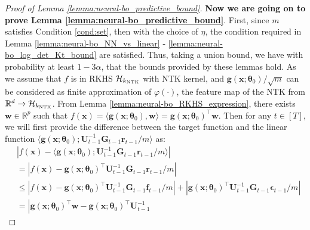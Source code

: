 \begin{proof}[Proof of Lemma \ref{lemma:neural-bo_predictive_bound}]
\noindent \textbf{Now we are going on to prove Lemma \ref{lemma:neural-bo_predictive_bound}}. First, since $m$ satisfies Condition \ref{cond:set}, then with the choice of $\eta$, the condition required in Lemma \ref{lemma:neural-bo_NN_vs_linear} - \ref{lemma:neural-bo_log_det_Kt_bound} are satisfied. Thus, taking a union bound, we have with probability at least $1 - 3\alpha$, that the bounds provided by these lemmas hold. 
As we assume that $f$ is in RKHS $\mathcal{H}_{k_\textup{NTK}}$ with NTK kernel, and $\mathbf{g}(\mathbf{x}; \boldsymbol{\theta}_0)/\sqrt{m}$  can be considered as finite approximation of $\varphi(\cdot)$, the feature map of the NTK from $\mathbb{R}^d \rightarrow \mathcal{H}_{k_\textup{NTK}}$. From Lemma \ref{lemma:neural-bo_RKHS_expression}, there exists $\mathbf{w} \in \mathbb{R}^p$ such that $f(\mathbf{x}) = \langle \mathbf{g}(\mathbf{x}; \boldsymbol{\theta}_0), \mathbf{w} \rangle = \mathbf{g}(\mathbf{x}; \boldsymbol{\theta}_0)^\top \mathbf{w}$. 
Then for any $t \in [T]$, we will first provide the difference between the target function and the linear function
$\langle \mathbf{g}(\mathbf{x}; \boldsymbol{\theta}_0); \mathbf{U}^{-1}_{t-1} \mathbf{G}_{t-1} \mathbf{r}_{t-1}/m \rangle$ as:
\begin{align}
        & \left \lvert f(\mathbf{x}) - \langle \mathbf{g}(\mathbf{x}; \boldsymbol{\theta}_0); \mathbf{U}^{-1}_{t-1} \mathbf{G}_{t-1} \mathbf{r}_{t-1}/m \rangle   \right \rvert  \nonumber
\\
        & = \left\lvert f(\mathbf{x}) - \mathbf{g}(\mathbf{x}; \boldsymbol{\theta}_0)^\top  \mathbf{U}^{-1}_{t-1} \mathbf{G}_{t-1} \mathbf{r}_{t-1}/m \right\rvert \nonumber
\\
        & \leq \left\lvert f(\mathbf{x}) - \mathbf{g}(\mathbf{x}; \boldsymbol{\theta}_0)^\top  \mathbf{U}^{-1}_{t-1}
        \mathbf{G}_{t-1}\mathbf{f}_{t-1}/m \right\rvert + 
        \left\lvert \mathbf{g}(\mathbf{x}; \boldsymbol{\theta}_0)^\top \mathbf{U}^{-1}_{t-1}
        \mathbf{G}_{t-1} \boldsymbol{\epsilon}_{t-1}/m \right\rvert \nonumber
\\
        & = \left\lvert \mathbf{g}(\mathbf{x}; \boldsymbol{\theta}_0)^\top \mathbf{w} - \mathbf{g}(\mathbf{x}; \boldsymbol{\theta}_0)^\top  \mathbf{U}^{-1}_{t-1} 

\end{align}
\end{proof}
